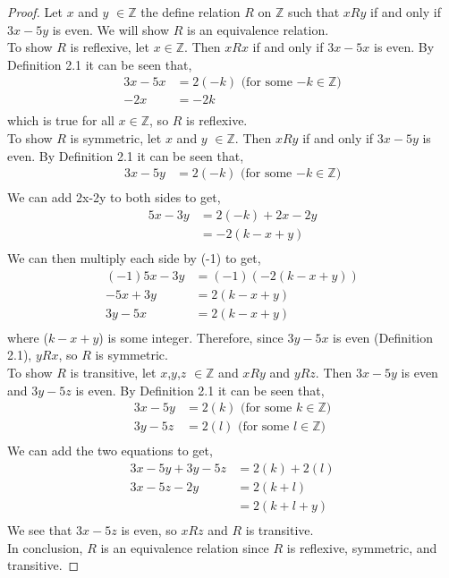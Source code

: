 \documentclass[12pt]{article}
\begin{document}
	\begin{proof}
	Let $x$ and $y$ $\in \mathbb{Z}$ the define relation $R$ on $\mathbb{Z}$ such that $xRy$ if and only if $3x-5y$ is even. We will show $R$ is an equivalence relation.\\

	To show $R$ is reflexive, let $x \in \mathbb{Z}$. Then $xRx$ if and only if $3x-5x$ is even. By Definition 2.1 it can be seen that,
	\begin{align*}
		3x-5x &= 2(-k) \text{ (for some $-k \in \mathbb{Z}$)}\\
		-2x &= -2k\\
	\end{align*}
	which is true for all $x \in \mathbb{Z}$, so $R$ is reflexive.\\

	To show $R$ is symmetric, let $x$ and $y$ $\in \mathbb{Z}$. Then $xRy$ if and only if $3x-5y$ is even. By Definition 2.1 it can be seen that,
	\begin{align*}
		3x-5y &= 2(-k) \text{ (for some $-k \in \mathbb{Z}$)}\\
	\end{align*}
	We can add 2x-2y to both sides to get,
	\begin{align*}
		5x-3y &= 2(-k) + 2x-2y\\
		      &= -2(k-x+y)\\
	\end{align*}
	We can then multiply each side by (-1) to get,
	\begin{align*}
		(-1)5x-3y &= (-1)(-2(k-x+y))\\
		-5x+3y&= 2(k-x+y)\\
		3y-5x &= 2(k-x+y)\\
	\end{align*}
	where ($k-x+y$) is some integer. Therefore, since $3y-5x$ is even (Definition 2.1), $yRx$, so
	$R$ is symmetric.\\

	To show $R$ is transitive, let $x$,$y$,$z$ $\in \mathbb{Z}$ and $xRy$ and $yRz$. 
	Then $3x-5y$ is even and $3y-5z$ is even. By Definition 2.1 it can be seen that,
	\begin{align*}
		3x-5y &= 2(k) \text{ (for some $k \in \mathbb{Z}$)}\\
		3y-5z &= 2(l) \text{ (for some $l \in \mathbb{Z}$)}\\
	\end{align*}
	We can add the two equations to get,
	\begin{align*}
		3x-5y + 3y-5z &= 2(k) + 2(l)\\
		3x-5z - 2y &= 2(k+l)\\
			   &= 2(k+l+y)\\
	\end{align*}
	We see that $3x-5z$ is even, so $xRz$ and $R$ is transitive.\\

	In conclusion, $R$ is an equivalence relation since $R$ is reflexive, symmetric, and transitive.
\end{proof}
	
\end{document}
